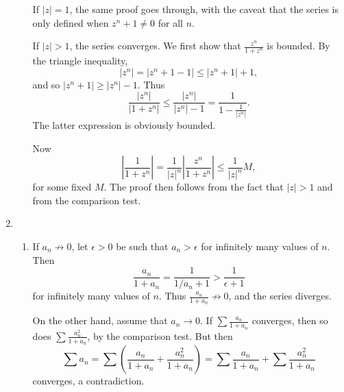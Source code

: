 \documentclass{article}
\begin{document}
\begin{enumerate}[label=\textbf{\arabic*.}]
\begin{enumerate}
If $|z| = 1$, the same proof goes through, with the caveat that the series is only defined when $z^n + 1 \neq 0$ for all $n$.

If $|z| > 1$, the series converges. We first show that $\frac{z^n}{1+z^n}$ is bounded. By the triangle inequality, \[|z^n| = |z^n + 1 - 1| \leq |z^n + 1| + 1,\] and so $|z^n + 1| \geq |z^n| - 1$. Thus \[\frac{|z^n|}{|1+z^n|} \leq \frac{|z^n|}{|z^n| - 1} = \frac{1}{1 - \frac{1}{|z^n|}}.\] The latter expression is obviously bounded.

Now \[\left|\frac{1}{1+z^n}\right| = \frac{1}{|z|^n}\left|\frac{z^n}{1+z^n}\right| \leq \frac{1}{|z|^n} M,\] for some fixed $M$. The proof then follows from the fact that $|z| > 1$ and from the comparison test.
\end{enumerate}
\setcounter{enumi}{10}
\item \begin{enumerate}
\item If $a_n\not\to 0$, let $\epsilon > 0$ be such that $a_n > \epsilon$ for infinitely many values of $n$. Then \[\frac{a_n}{1+a_n} = \frac{1}{1/a_n+1} > \frac{1}{\epsilon+1}\] for infinitely many values of $n$. Thus $\frac{a_n}{1+a_n}\not\to 0$, and the series diverges.

On the other hand, assume that $a_n\to 0$. If $\sum\frac{a_n}{1+a_n}$ converges, then so does $\sum\frac{a_n^2}{1+a_n}$, by the comparison test. But then \[\sum a_n = \sum\left(\frac{a_n}{1+a_n} + \frac{a_n^2}{1+a_n}\right) = \sum\frac{a_n}{1+a_n} + \sum\frac{a_n^2}{1+a_n}\] converges, a contradiction.
\end{enumerate}
\end{enumerate}
\end{document}
